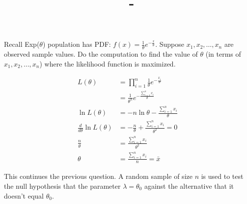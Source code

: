 \documentclass[answers,12pt,addpoints]{exam}
\author{\name}
\title{\course \ - \assignment}
\begin{document}
\maketitle


\newpage
\begin{questions}
    \question Recall Exp($\theta$) population has PDF: $f(x) = \frac{1}{\theta} e^{-\frac{x}{\theta}}$.
    Suppose $x_1, x_2, \ldots, x_n$ are observed sample values. Do the computation to find the value of $\theta$ (in terms of $x_1, x_2, \ldots, x_n$) where the likelihood function is maximized.

    \begin{solution}
        \begin{align*}
            L(\theta) &= \prod_{i=1}^{n} \frac{1}{\theta} e^{-\frac{x_i}{\theta}} \\
            &= \frac{1}{\theta^n} e^{-\frac{\sum_{i=1}^{n} x_i}{\theta}} \\
            \ln L(\theta) &= -n \ln \theta - \frac{\sum_{i=1}^{n} x_i}{\theta} \\
            \frac{d}{d\theta} \ln L(\theta) &= -\frac{n}{\theta} + \frac{\sum_{i=1}^{n} x_i}{\theta^2} = 0 \\
            \frac{n}{\theta} &= \frac{\sum_{i=1}^{n} x_i}{\theta^2} \\
            \theta &= \frac{\sum_{i=1}^{n} x_i}{n} = \bar{x}
        \end{align*}
        

    \end{solution}

    \question This continues the previous question. A random sample of size $n$ is used to test the null hypothesis that the parameter $\lambda = \theta_0$ against the alternative that it doesn’t equal $\theta_0$.
\end{questions}
\end{document}
